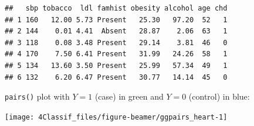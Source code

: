 \documentclass[
  10pt,
  ignorenonframetext,
]{beamer}
\newenvironment{Shaded}{\begin{snugshade}}{\end{snugshade}}
\newcommand{\FunctionTok}[1]{\textcolor[rgb]{0.13,0.29,0.53}{\textbf{#1}}}
\newcommand{\NormalTok}[1]{#1}
\newcommand{\OtherTok}[1]{\textcolor[rgb]{0.56,0.35,0.01}{#1}}
\newcommand{\SpecialCharTok}[1]{\textcolor[rgb]{0.81,0.36,0.00}{\textbf{#1}}}
\newcommand{\StringTok}[1]{\textcolor[rgb]{0.31,0.60,0.02}{#1}}
\begin{document}
\begin{frame}[fragile]
\footnotesize

\begin{Shaded}
\end{Shaded}

\begin{verbatim}
##   sbp tobacco  ldl famhist obesity alcohol age chd
## 1 160   12.00 5.73 Present   25.30   97.20  52   1
## 2 144    0.01 4.41  Absent   28.87    2.06  63   1
## 3 118    0.08 3.48 Present   29.14    3.81  46   0
## 4 170    7.50 6.41 Present   31.99   24.26  58   1
## 5 134   13.60 3.50 Present   25.99   57.34  49   1
## 6 132    6.20 6.47 Present   30.77   14.14  45   0
\end{verbatim}

\normalsize
\end{frame}

\begin{frame}[fragile]
\texttt{pairs()} plot with \(Y=1\) (case) in green and \(Y=0\) (control)
in blue:

\begin{center}\texttt{[image: 4Classif\_files/figure-beamer/ggpairs\_heart-1]} \end{center}
\end{frame}
\end{document}
